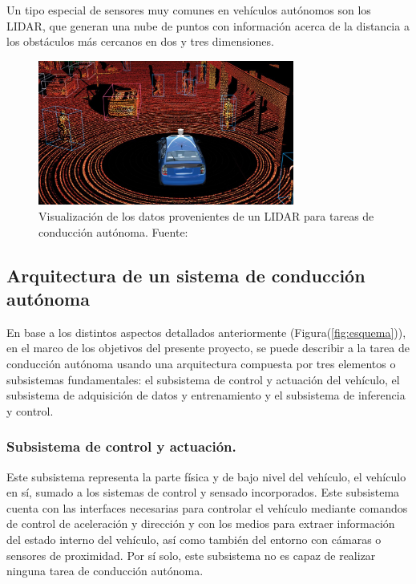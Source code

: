         Un tipo especial de sensores muy comunes en vehículos autónomos son los LIDAR, que generan una nube de puntos 
        con información acerca de la distancia a los obstáculos más cercanos en dos y tres dimensiones.
        \begin{figure}[!h] 
            \centering
            \includegraphics[width=0.75\textwidth]{img/lidar}
            \caption{Visualización de los datos provenientes de un LIDAR para tareas de conducción autónoma. Fuente: \cite{cameron_2017} }
            \label{fig:lidar}
        \end{figure}
        

    \subsection{Arquitectura de un sistema de conducción autónoma}
    En base a los distintos aspectos detallados anteriormente (Figura(\ref{fig:esquema})), en el marco de los objetivos del presente 
    proyecto, se puede describir a la tarea de conducción autónoma usando una arquitectura compuesta 
    por tres elementos o subsistemas fundamentales: el subsistema de control y actuación del vehículo, el 
    subsistema de adquisición de datos y entrenamiento y el subsistema de inferencia y control.

        \subsubsection{Subsistema de control y actuación.}
        Este subsistema representa la parte física y de bajo nivel del vehículo, el vehículo en sí, 
        sumado a los sistemas de control y sensado incorporados. Este subsistema cuenta con las interfaces necesarias 
        para controlar el vehículo mediante comandos de control de aceleración y dirección y con los medios 
        para extraer información del estado interno del vehículo, así como también del entorno con cámaras o sensores 
        de proximidad. Por sí solo, este subsistema no es capaz de realizar ninguna tarea de conducción autónoma.

